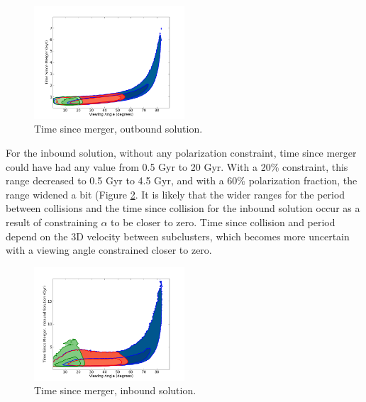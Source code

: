 \documentclass[12 pt]{article}
\renewcommand{\baselinestretch}{2}
\begin{document}
\renewcommand{\baselinestretch}{1}
\begin{figure}[h]
\caption{Time since merger, outbound solution.}
\label{TSM0}
\centering
\includegraphics[width=0.5\textwidth]{alpha_TSM_0}
\end{figure}
\renewcommand{\baselinestretch}{2}

For the inbound solution, without any polarization constraint, time since merger could have had any value from 0.5 Gyr to 20 Gyr. With a 20\% constraint, this range decreased to 0.5 Gyr to 4.5 Gyr, and with a 60\% polarization fraction, the range widened a bit (Figure \ref{TSM1}. It is likely that the wider ranges for the period between collisions and the time since collision for the inbound solution occur as a result of constraining $\alpha$ to be closer to zero. Time since collision and period depend on the 3D velocity between subclusters, which becomes more uncertain with a viewing angle constrained closer to zero. 

\renewcommand{\baselinestretch}{1}
\begin{figure}[h]
\caption{Time since merger, inbound solution.}
\label{TSM1}
\centering
\includegraphics[width=0.5\textwidth]{alpha_TSM_1}
\end{figure}
\renewcommand{\baselinestretch}{2}
\end{document}
